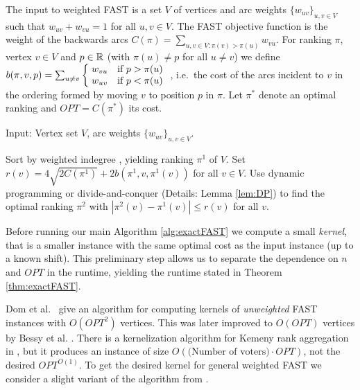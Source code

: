 \documentclass[envcountsame,oribibl]{llncs}
\makeatletter
\newcommand{\piecewise}[1]{\left\{\begin{array}{@{\;}ll}#1\end{array}\right.}
\newcommand{\set}[1]{\{#1\}}                        \newcommand{\setof}[2]{\{\,{#1}\::\:{#2}\,\}}        \newcommand{\groupFrac}[2]{\left(\frac{#1}{#2}\right)}
\newcommand{\fast}{\textsc{FAST}}
\makeatother
\begin{document}
The input to weighted \fast{} is a set $V$ of vertices and arc weights $\set{w_{uv}}_{u,v \in V}$ such that $w_{uv} + w_{vu} = 1$ for all $u,v \in V$. 
The \fast{} objective function is the weight of the backwards arcs $C(\pi)=\sum_{u,v \in V : \pi(v)>\pi(u)} w_{vu}$. For ranking $\pi$, vertex $v \in V$ and $p \in \mathbb{R}$ (with $\pi(u) \ne p$ for all $u \ne v$) we define $b(\pi,v,p) = \sum_{u \ne v} \piecewise{w_{vu} & \text{if } p > \pi(u) \\ w_{uv} &  \text{if } p < \pi(u)}$, i.e.\ the cost of the arcs incident to $v$ in the ordering formed by moving $v$ to position $p$ in $\pi$.
Let $\pi^*$ denote an optimal ranking and $OPT=C(\pi^*)$ its cost.

\begin{algorithm}[t]
Input: Vertex set $V$, arc weights $\set{w_{uv}}_{u,v\in V}$.
\begin{algorithmic}[1]
\STATE Sort by weighted indegree \cite{Coppersmith06}, yielding ranking $\pi^1$ of $V$.
\STATE Set $r(v) = 4\sqrt{2C(\pi^1)} + 2b(\pi^1,v,\pi^1(v))$ for all $v \in V$.
\STATE Use dynamic programming or divide-and-conquer (Details: Lemma \ref{lem:DP}) to find the optimal ranking $\pi^2$ with $|\pi^2(v) - \pi^1(v)| \le r(v)$ for all $v$.
\end{algorithmic}
\caption{Exact algorithm for FAST. If dynamic programming is used in the last line the runtime and space are both $n^{O(1)} 2^{O(\sqrt{OPT})}$. If divide-and-conquer is used the runtime is $n^{O(\sqrt{OPT})}$ and the space is $n^{O(1)}$.}
\label{alg:exactFAST}
\end{algorithm}


\medskip

Before running our main Algorithm \ref{alg:exactFAST} we compute a small \emph{kernel}, that is a smaller instance with the same optimal cost as the input instance (up to a known shift). This preliminary step allows us to separate the dependence on $n$ and $OPT$ in the runtime, yielding the runtime stated in Theorem \ref{thm:exactFAST}.

Dom et al.\ \cite{Dom06} give an algorithm for computing kernels of \emph{unweighted} FAST instances with $O(OPT^2)$ vertices. This was later improved to $O(OPT)$ vertices by Bessy et al. \cite{Bessy09}. There is a kernelization algorithm for Kemeny rank aggregation in \cite{Betzler09}, but it produces an instance of size $O(\text{(Number of voters)} \cdot OPT)$, not the desired $OPT^{O(1)}$. To get the desired kernel for general weighted \fast{} we consider a slight variant of the algorithm from \cite{Dom06}.
\end{document}

